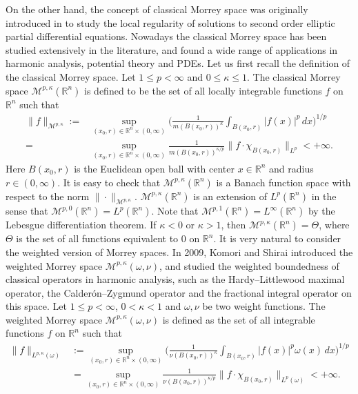 \documentclass[preprint,10pt]{elsarticle}
\numberwithin{equation}{section}
\begin{document}
On the other hand, the concept of classical Morrey space was originally introduced in \cite{morrey} to study the local regularity of solutions to second order elliptic partial differential equations. Nowadays the classical Morrey space has been studied extensively in the literature, and found a wide range of applications in harmonic analysis, potential theory and PDEs. Let us first recall the definition of the classical Morrey space. Let $1\leq p<\infty$ and $0\leq\kappa\leq1$. The classical Morrey space $\mathcal{M}^{p,\kappa}(\mathbb R^n)$ is defined to be the set of all locally integrable functions $f$ on $\mathbb R^n$ such that
\begin{equation*}
\begin{split}
\|f\|_{\mathcal{M}^{p,\kappa}}:=&\sup_{(x_0,r)\in\mathbb R^n\times(0,\infty)}
\bigg(\frac{1}{m(B(x_0,r))^{\kappa}}\int_{B(x_0,r)}|f(x)|^p\,dx\bigg)^{1/p}\\
=&\sup_{(x_0,r)\in\mathbb R^n\times(0,\infty)}\frac{1}{m(B(x_0,r))^{\kappa/p}}\big\|f\cdot\chi_{B(x_0,r)}\big\|_{L^p}<+\infty.
\end{split}
\end{equation*}
Here $B(x_0,r)$ is the Euclidean open ball with center $x\in\mathbb R^n$ and radius $r\in(0,\infty)$. It is easy to check that $\mathcal{M}^{p,\kappa}(\mathbb R^n)$ is a Banach function space with respect to the norm $\|\cdot\|_{\mathcal{M}^{p,\kappa}}$. $\mathcal{M}^{p,\kappa}(\mathbb R^n)$ is an extension of $L^p(\mathbb R^n)$ in the sense that $\mathcal{M}^{p,0}(\mathbb R^n)=L^p(\mathbb R^n)$. Note that $\mathcal{M}^{p,1}(\mathbb R^n)=L^{\infty}(\mathbb R^n)$ by the Lebesgue
differentiation theorem. If $\kappa<0$ or $\kappa>1$, then $\mathcal{M}^{p,\kappa}(\mathbb R^n)=\Theta$, where $\Theta$ is the set of all functions equivalent to $0$ on $\mathbb R^n$. It is very natural to consider the weighted version of Morrey spaces. In 2009, Komori and Shirai \cite{komori} introduced the weighted Morrey space $\mathcal{M}^{p,\kappa}(\omega,\nu)$, and studied the weighted boundedness of classical
operators in harmonic analysis, such as the Hardy--Littlewood maximal operator, the Calder\'{o}n--Zygmund operator and the fractional integral operator on this space. Let $1\leq p<\infty$, $0<\kappa<1$ and $\omega,\nu$ be two weight functions. The weighted Morrey space $\mathcal{M}^{p,\kappa}(\omega,\nu)$ is defined as the set of all integrable functions $f$ on $\mathbb R^n$ such that
\begin{equation*}
\begin{split}
\big\|f\big\|_{L^{p,\kappa}(\omega)}&:=\sup_{(x_0,r)\in\mathbb R^n\times(0,\infty)}\bigg(\frac{1}{\nu(B(x_0,r))^{\kappa}}\int_{B(x_0,r)}|f(x)|^p\omega(x)\,dx\bigg)^{1/p}\\
&=\sup_{(x_0,r)\in\mathbb R^n\times(0,\infty)}\frac{1}{\nu(B(x_0,r))^{\kappa/p}}\big\|f\cdot\chi_{B(x_0,r)}\big\|_{L^p(\omega)}<+\infty.
\end{split}
\end{equation*}
\end{document}
